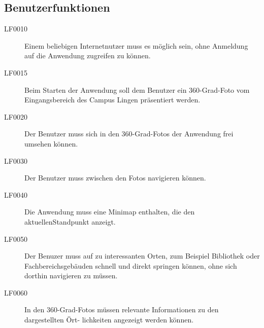 \subsection{Benutzerfunktionen}
\label{sec:Benutzerfunktionen}

\begin{description}
  \item[LF0010] Einem beliebigen Internetnutzer muss es möglich sein, ohne Anmeldung auf die
  Anwendung zugreifen zu können.
  \item[LF0015] Beim Starten der Anwendung soll dem Benutzer ein 360-Grad-Foto vom
  Eingangsbereich des Campus Lingen präsentiert werden.
  \item[LF0020] Der Benutzer muss sich in den 360-Grad-Fotos der Anwendung frei umsehen
  können.
  \item[LF0030] Der Benutzer muss zwischen den Fotos navigieren können.
  \item[LF0040] Die Anwendung muss eine Minimap enthalten, die den aktuellenStandpunkt anzeigt.
  \item[LF0050] Der Benuzer muss auf zu interessanten Orten, zum Beispiel Bibliothek oder Fachbereichsgebäuden schnell und direkt springen können, ohne sich dorthin navigieren zu müssen.
  \item[LF0060] In den 360-Grad-Fotos müssen relevante Informationen zu den dargestellten Ört-
  lichkeiten angezeigt werden können.
\end{description}